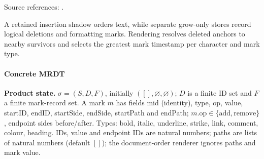 \noindent Source references: \cite{Peritext}.













A retained insertion shadow orders text, while separate grow-only stores record logical deletions and formatting marks. Rendering resolves deleted anchors to nearby survivors and selects the greatest mark timestamp per character and mark type.

\paragraph{Concrete MRDT}
\textbf{Product state.} $\sigma=(S,D,F)$, initially $([],\varnothing,\varnothing)$; $D$ is a finite ID set and $F$ a finite mark-record set. A mark $m$ has fields mid (identity), type, op, value, startID, endID,
startSide, endSide, startPath and endPath; $m.\mathrm{op}\in\{\mathrm{add},\mathrm{remove}\}$, endpoint sides before/after. Types: bold, italic, underline, strike, link, comment, colour, heading. IDs, value and endpoint IDs are natural numbers; paths are lists of natural numbers (default $[]$); the document-order renderer ignores paths and mark value.


